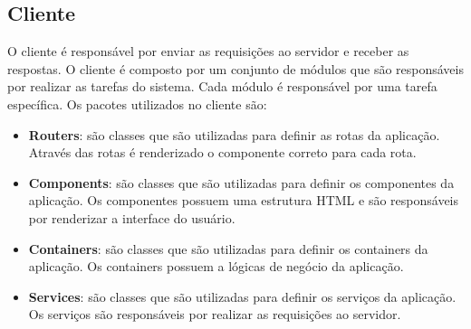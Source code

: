 \subsection{Cliente}

O cliente é responsável por enviar as requisições ao servidor e receber as respostas. O cliente é composto por um conjunto de módulos que são responsáveis por realizar as tarefas do sistema. Cada módulo é responsável por uma tarefa específica. Os pacotes utilizados no cliente são:

\begin{itemize}
    \item \textbf{Routers}: são classes que são utilizadas para definir as rotas da aplicação. Através das rotas é renderizado o componente correto para cada rota.
    \item \textbf{Components}: são classes que são utilizadas para definir os componentes da aplicação. Os componentes possuem uma estrutura HTML e são responsáveis por renderizar a interface do usuário.
    \item \textbf{Containers}: são classes que são utilizadas para definir os containers da aplicação. Os containers possuem a lógicas de negócio da aplicação.
    \item \textbf{Services}: são classes que são utilizadas para definir os serviços da aplicação. Os serviços são responsáveis por realizar as requisições ao servidor.
\end{itemize}

